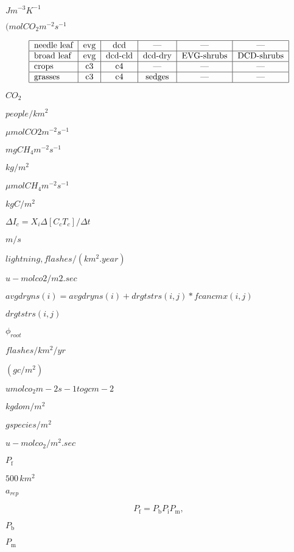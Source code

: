 \documentclass{article}
\begin{document}
$J m^{-3} K^{-1}$
\pagebreak

$(mol CO_2 m^{-2} s^{-1}$
\pagebreak

\[ \begin{tabular} { | l | c | c | c | c | c | } \hline needle leaf & evg & dcd & --- & ---& ---\\ \hline broad leaf & evg & dcd-cld & dcd-dry & EVG-shrubs & DCD-shrubs\\ \hline crops & c3 & c4 & --- & ---& ---\\ \hline grasses & c3 & c4 & sedges & ---& ---\\ \hline \end{tabular} \]
\pagebreak

$CO_2$
\pagebreak

$people/km^2$
\pagebreak

$\mu mol CO2 m^{-2} s^{-1}$
\pagebreak

$mg CH_4 m^{-2} s^{-1}$
\pagebreak

$kg/m^2$
\pagebreak

$\mu mol CH_4 m^{-2} s^{-1}$
\pagebreak

$kg C/m^2$
\pagebreak

$\Delta I_c = X_i \Delta [C_c T_c ] / \Delta t$
\pagebreak

$m/s$
\pagebreak

$lightning, flashes/(km^2 . year)$
\pagebreak

$u-mol co2/m2.sec$
\pagebreak

$avgdryns(i) = avgdryns(i) + drgtstrs(i,j)*fcancmx(i,j)$
\pagebreak

$drgtstrs(i,j)$
\pagebreak

$\phi_{root}$
\pagebreak

$flashes/km^2/yr$
\pagebreak

$(g c/m^2)$
\pagebreak

$umol co_2 m-2 s-1 to g c m-2$
\pagebreak

$kg dom / m^2$
\pagebreak

$g species / m^2$
\pagebreak

$u-mol co_2/m^2.sec$
\pagebreak

$P_\mathrm{f}$
\pagebreak

$500\,km^2$
\pagebreak

$a_{rep}$
\pagebreak

\[ \label{fieya} P_\mathrm{f} = P_\mathrm{b}P_\mathrm{i}P_\mathrm{m},\]
\pagebreak

$P_\mathrm{b}$
\pagebreak

$P_\mathrm{m}$
\pagebreak
\end{document}
